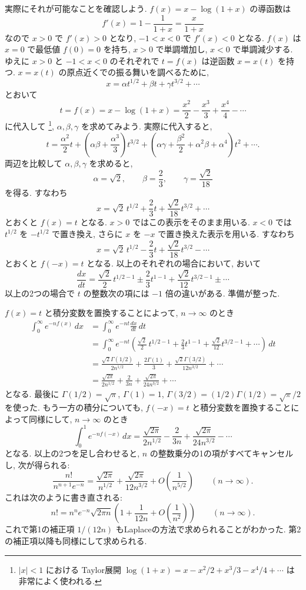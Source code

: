 \documentclass[12pt,twoside]{jarticle}
\theoremstyle{jplain}
\theoremstyle{jplain}
\theoremstyle{jplain}
\numberwithin{theorem}{section}
\numberwithin{equation}{section}
\numberwithin{figure}{section}
\numberwithin{table}{section}
\begin{document}
実際にそれが可能なことを確認しよう.
$f(x)=x-\log(1+x)$ の導函数は
\[
f'(x) = 1 - \frac{1}{1+x} = \frac{x}{1+x}
\]
なので $x>0$ で $f'(x)>0$ となり, $-1<x<0$ で $f'(x)<0$ となる.
$f(x)$ は $x=0$ で最低値 $f(0)=0$ を持ち, $x>0$ で単調増加し,
$x<0$ で単調減少する.
ゆえに $x>0$ と $-1<x<0$ のそれぞれで $t=f(x)$ は逆函数 $x=x(t)$ を持つ.
$x=x(t)$ の原点近くでの振る舞いを調べるために,
\[
x = \alpha t^{1/2} + \beta t + \gamma t^{3/2} + \cdots
\]
とおいて
\[
t = f(x) = x - \log(1+x)
= \frac{x^2}{2} - \frac{x^3}{3} + \frac{x^4}{4} - \cdots
\]
に代入して%
\footnote{$|x|<1$ における
Taylor展開 $\log(1+x)=x-x^2/2+x^3/3-x^4/4+\cdots$ は非常によく使われる.},
$\alpha,\beta,\gamma$ を求めてみよう.
実際に代入すると,
\[
t
= \frac{\alpha^2}{2} t
+ \left( \alpha\beta + \frac{\alpha^3}{3} \right) t^{3/2}
+ \left( \alpha\gamma + \frac{\beta^2}{2} + \alpha^2\beta + \alpha^4 \right) t^2
+ \cdots.
\]
両辺を比較して $\alpha,\beta,\gamma$ を求めると,
\[
\alpha = \sqrt{2}, \qquad
\beta = \frac{2}{3}, \qquad
\gamma = \frac{\sqrt{2}}{18}
\]
を得る. すなわち
\[
x = \sqrt{2}\,t^{1/2} + \frac{2}{3}t + \frac{\sqrt{2}}{18}t^{3/2} + \cdots
\]
とおくと $f(x)=t$ となる.
$x>0$ ではこの表示をそのまま用いる.
$x<0$ では $t^{1/2}$ を $-t^{1/2}$ で置き換え,
さらに $x$ を $-x$ で置き換えた表示を用いる.
すなわち
\[
x = \sqrt{2}\,t^{1/2} - \frac{2}{3}t + \frac{\sqrt{2}}{18}t^{3/2} - \cdots
\]
とおくと $f(-x)=t$ となる. 以上のそれぞれの場合において,
おいて
\[
\frac{dx}{dt}
=
\frac{\sqrt{2}}{2}\,t^{1/2-1}
\pm \frac{2}{3}t^{1-1}
+ \frac{\sqrt{2}}{12}t^{3/2-1}
\pm \cdots
\]
以上の2つの場合で $t$ の整数次の項には $-1$ 倍の違いがある.
準備が整った.

$f(x)=t$ と積分変数を置換することによって, $n\to\infty$ のとき
\begin{align*}
\int_0^\infty e^{-nf(x)}\,dx
&=\int_0^\infty e^{-nt}\frac{dx}{dt}\,dt
\\ &
= \int_0^\infty e^{-nt}
\left(
\frac{\sqrt{2}}{2}\,t^{1/2-1}
+ \frac{2}{3}t^{1-1}
+ \frac{\sqrt{2}}{12}t^{3/2-1}
+ \cdots
\right)
\,dt
\\ &
=
\frac{\sqrt{2}\Gamma(1/2)}{2n^{1/2}}
+\frac{2\Gamma(1)}{3}
+\frac{\sqrt{2}\Gamma(3/2)}{12n^{3/2}}
+\cdots
\\ &
=
\frac{\sqrt{2\pi}}{2n^{1/2}}
+\frac{2}{3n}
+\frac{\sqrt{2\pi}}{24n^{3/2}}
+\cdots
\end{align*}
となる. 最後に $\Gamma(1/2)=\sqrt{\pi}$, $\Gamma(1)=1$,
$\Gamma(3/2)=(1/2)\Gamma(1/2)=\sqrt{\pi}/2$ を使った.
もう一方の積分についても,
$f(-x)=t$ と積分変数を置換することによって同様にして,
$n\to\infty$ のとき
\[
\int_0^1 e^{-nf(-x)}\,dx
=
\frac{\sqrt{2\pi}}{2n^{1/2}}
-\frac{2}{3n}
+\frac{\sqrt{2\pi}}{24n^{3/2}}
-\cdots
\]
となる. 以上の2つを足し合わせると,
$n$ の整数乗分の1の項がすべてキャンセルし,
次が得られる:
\[
\frac{n!}{n^{n+1}e^{-n}}
=
\frac{\sqrt{2\pi}}{n^{1/2}}
+\frac{\sqrt{2\pi}}{12n^{3/2}}
+O\left(\frac{1}{n^{5/2}}\right)
\qquad
(n\to\infty).
\]
これは次のように書き直される:
\[
n!
= n^n e^{-n}\sqrt{2\pi n}
\left(1 + \frac{1}{12n} + O\left(\frac{1}{n^2}\right) \right)
\qquad (n\to\infty).
\]
これで第1の補正項 $1/(12n)$ もLaplaceの方法で求められることがわかった.
第2の補正項以降も同様にして求められる.
\end{document}
